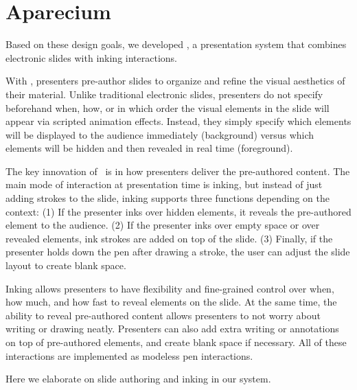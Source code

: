 

\section{Aparecium}

Based on these design goals, we developed \interface, a presentation system that combines electronic slides with inking interactions. 

With \interface, presenters pre-author slides to organize and refine the visual aesthetics of their material.
%
Unlike traditional electronic slides, presenters do not specify beforehand when, how, or in which order the visual elements in the slide will appear via scripted animation effects. Instead, they simply specify which elements will be displayed to the audience immediately (background) versus which elements will be hidden and then revealed in real time (foreground). 

The key innovation of \interface\ is in how presenters deliver the pre-authored content.  The main mode of interaction at presentation time is inking, but instead of just adding strokes to the slide, inking supports three functions depending on the context: (1) If the presenter inks over hidden elements, it reveals the pre-authored element to the audience. (2) If the presenter inks over empty space or over revealed elements, ink strokes are added on top of the slide. (3) Finally, if the presenter holds down the pen after drawing a stroke, the user can adjust the slide layout to create blank space. 

Inking allows presenters to have flexibility and fine-grained control over when, how much, and how fast to reveal elements on the slide.
%
At the same time, the ability to reveal pre-authored content allows presenters to not worry about writing or drawing neatly.
%
Presenters can also add extra writing or annotations on top of pre-authored elements, and create blank space if necessary. 
%
All of these interactions are implemented as modeless pen interactions.

Here we elaborate on slide authoring and inking in our system.
